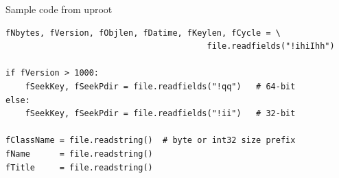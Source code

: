 \documentclass[aspectratio=169]{beamer}
\begin{document}
\begin{frame}[fragile]{Sample code from uproot}
\vspace{0.5 cm}
\small
\begin{verbatim}
fNbytes, fVersion, fObjlen, fDatime, fKeylen, fCycle = \
                                         file.readfields("!ihiIhh")

if fVersion > 1000:
    fSeekKey, fSeekPdir = file.readfields("!qq")   # 64-bit
else:
    fSeekKey, fSeekPdir = file.readfields("!ii")   # 32-bit

fClassName = file.readstring()  # byte or int32 size prefix
fName      = file.readstring()
fTitle     = file.readstring()
\end{verbatim}

\vspace{0.25 cm}
\begin{center}
\end{center}
\end{frame}
\end{document}
